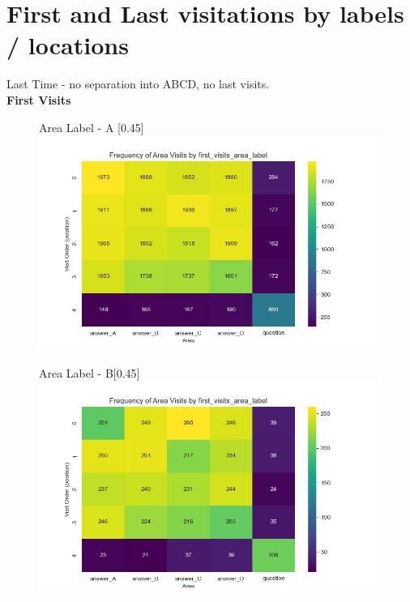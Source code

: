 \documentclass{article}
\begin{document}
\section{First and Last visitations by labels / locations}

Last Time - no separation into ABCD, no last visits. 
\\

\textbf{First Visits}

\begin{figure}[H]
  \centering
  \begin{subcaptionbox}{Area Label - A \label{fig:al_a}}[0.45\textwidth]
    {\centering\includegraphics[width=\linewidth]{plots/visits/matrix__first_visits_area_label_hunters_A.png}}
  \end{subcaptionbox}
  \hfill
  \begin{subcaptionbox}{Area Label - B\label{fig:al_b}}[0.45\textwidth]
    {\centering\includegraphics[width=\linewidth]{plots/visits/matrix__first_visits_area_label_hunters_B.png}}
  \end{subcaptionbox}
  

\end{figure}
\end{document}
